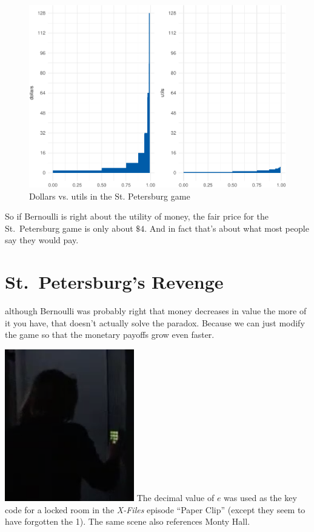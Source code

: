 \documentclass[justified]{tufte-book}
\theoremstyle{definition}
\theoremstyle{definition}
\theoremstyle{definition}
\theoremstyle{remark}
\begin{document}
\begin{figure}
\includegraphics{_main_files/figure-latex/logstp-1} \caption[Dollars vs]{Dollars vs. utils in the St. Petersburg game}\label{fig:logstp}
\end{figure}

So if Bernoulli is right about the utility of money, the fair price for the St.~Petersburg game is only about \(\$4\). And in fact that's about what most people say they would pay.

\hypertarget{st.petersburgs-revenge}{%
\section{St.~Petersburg's Revenge}\label{st.petersburgs-revenge}}

 although Bernoulli was probably right that money decreases in value the more of it you have, that doesn't actually solve the paradox. Because we can just modify the game so that the monetary payoffs grow even faster.

\begin{marginfigure}
\includegraphics{img/xfiles.png} The decimal value of \(e\) was used as
the key code for a locked room in the \emph{X-Files} episode ``Paper
Clip'' (except they seem to have forgotten the 1). The same scene also
references Monty Hall.
\end{marginfigure}
\end{document}
